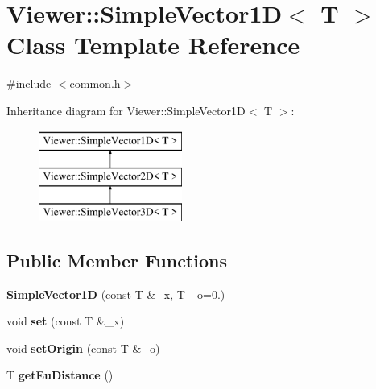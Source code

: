 \hypertarget{classViewer_1_1SimpleVector1D}{}\section{Viewer\+:\+:Simple\+Vector1D$<$ T $>$ Class Template Reference}
\label{classViewer_1_1SimpleVector1D}


{\ttfamily \#include $<$common.\+h$>$}

Inheritance diagram for Viewer\+:\+:Simple\+Vector1D$<$ T $>$\+:\begin{figure}[H]
\begin{center}
\leavevmode
\includegraphics[height=3.000000cm]{classViewer_1_1SimpleVector1D}
\end{center}
\end{figure}
\subsection*{Public Member Functions}
\begin{DoxyCompactItemize}
\item 
\mbox{\label{classViewer_1_1SimpleVector1D_acb3334996f977cb906995ebf154a9fa8}} 
{\bfseries Simple\+Vector1D} (const T \&\+\_\+x, T \+\_\+o=0.)
\item 
\mbox{\label{classViewer_1_1SimpleVector1D_a6b8fdb4e646f7826ce8ccfb41c4c45db}} 
void {\bfseries set} (const T \&\+\_\+x)
\item 
\mbox{\label{classViewer_1_1SimpleVector1D_ac531dcabcb8b7d26125aedb2bc23a294}} 
void {\bfseries set\+Origin} (const T \&\+\_\+o)
\item 
\mbox{\label{classViewer_1_1SimpleVector1D_a8b9416bd2f5f50d35b1b9f0adff516eb}} 
T {\bfseries get\+Eu\+Distance} ()
\end{DoxyCompactItemize}
